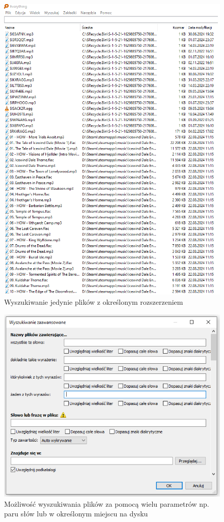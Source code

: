 \documentclass[0.82pt,a4paper]{article}
\begin{document}
    \begin{figure}[H]
        \centering
        \includegraphics[width=0.8\linewidth]{media/EverythingTool/ev5.png}
        \caption[everything typ]{Wyszukiwanie jedynie plików z określonym rozszerzeniem}
        \label{fig:ev_rozszerz}
    \end{figure}

    \begin{figure}[H]
        \centering
        \includegraphics[width=0.8\linewidth]{media/EverythingTool/ev6.PNG}
        \caption[everything filtrowanie dokladne]{Możliwość wyszukiwania plików za pomocą wielu parametrów np. paru słów lub w określonym miejscu na dysku}
        \label{fig:ev_param}
    \end{figure}
\end{document}

